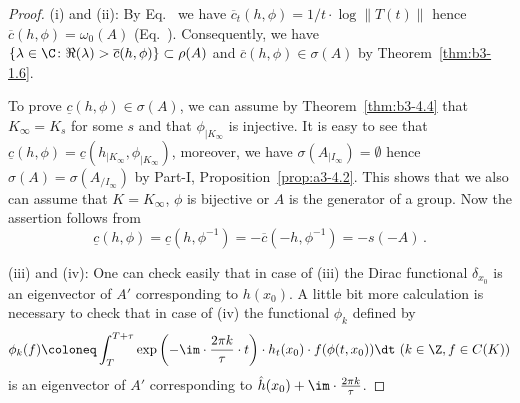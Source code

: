\begin{proof}	
	(i) and (ii): By Eq.~ we have $\overline{c}_{t}(h,\phi) = 1/t\cdot\log\|T(t)\|$ hence $\overline{c}(h,\phi) = \omega_{0}(A)$ (\cf Eq.~).  
	Consequently, we have $\{\lambda \in \C \colon \Re(\lambda) > \overline{c}(h,\phi)\} \subset \rho(A)$ and $\overline{c}(h,\phi) \in \sigma(A)$ by Theorem~\ref{thm:b3-1.6}.
	
	To prove $\underline{c}(h,\phi) \in \sigma(A)$, we can assume by Theorem~\ref{thm:b3-4.4} that $K_{\infty} = K_{s}$ for some $s$ and that $\phi_{|K_{\infty}}$ is injective.
	It is easy to see that $\underline{c}(h,\phi) = \underline{c}(h_{|K_{\infty}},\phi_{|K_{\infty}})$, moreover, we have $\sigma(A_{|I_{\infty}}) = \emptyset$ hence $\sigma(A) = \sigma(A_{/I_{\infty}})$ by Part-I, Proposition~\ref{prop:a3-4.2}.
	This shows that we also can assume that $K = K_{\infty}$, \ie $\phi$ is bijective or $A$ is the generator of a group.
	Now the assertion follows from 
    \[
    \underline{c}(h,\phi) = \underline{c}(h,\phi^{-1}) = -\overline{c}(-h,\phi^{-1}) = -s(-A)\,.
    \]
	
	(iii) and (iv): One can check easily that in case of (iii) the Dirac functional $\delta_{x_{0}}$ is an eigenvector of\/ $A'$ corresponding to $h(x_{0})$.
    A little bit more calculation is necessary to check that in case of (iv) the functional $\phi_{k}$ defined by
\[
	\phi_{k}(f) \coloneq \int_{T}^{T+\tau} \exp\left(-\im\cdot\frac{2\pi k}{\tau}\cdot t\right)\cdot h_{t}(x_{0})\cdot f(\phi(t,x_{0})) \dt  \ (k \in \Z, f \in C(K))
\]
    is an eigenvector of\/ $A'$ corresponding to $\hat{h}(x_{0}) + \im\cdot\frac{2\pi k}{\tau}$.


\end{proof}

